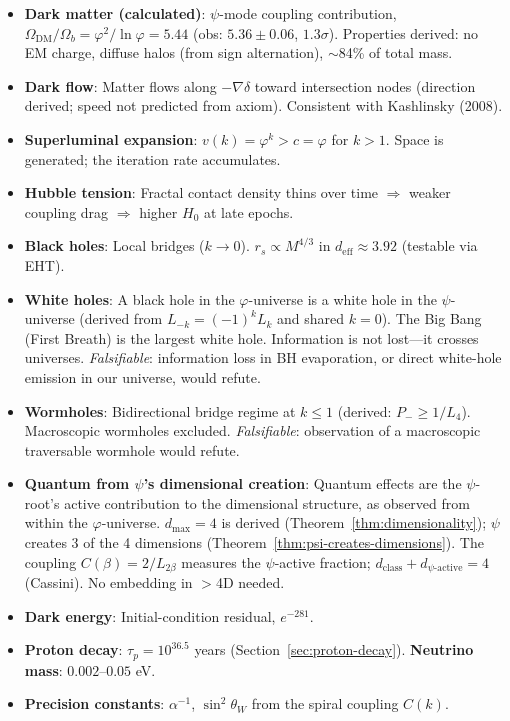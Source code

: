 \documentclass[12pt,a4paper]{article}
\begin{document}
\begin{itemize}
\item \textbf{Dark matter (calculated)}: $\psi$-mode coupling contribution, $\Omega_{\text{DM}}/\Omega_b = \varphi^2/\ln\varphi = 5.44$ (obs: $5.36 \pm 0.06$, $1.3\sigma$).  Properties derived: no EM charge, diffuse halos (from sign alternation), $\sim$84\% of total mass.
\item \textbf{Dark flow}: Matter flows along $-\nabla\delta$ toward intersection nodes (direction derived; speed not predicted from axiom). Consistent with Kashlinsky (2008).
\item \textbf{Superluminal expansion}: $v(k) = \varphi^k > c = \varphi$ for $k > 1$. Space is generated; the iteration rate accumulates.
\item \textbf{Hubble tension}: Fractal contact density thins over time $\Rightarrow$ weaker coupling drag $\Rightarrow$ higher $H_0$ at late epochs.
\item \textbf{Black holes}: Local bridges ($k \to 0$). $r_s \propto M^{4/3}$ in $d_{\mathrm{eff}} \approx 3.92$ (testable via EHT).
\item \textbf{White holes}: A black hole in the $\varphi$-universe is a white hole in the $\psi$-universe (derived from $L_{-k} = (-1)^k L_k$ and shared $k = 0$). The Big Bang (First Breath) is the largest white hole. Information is not lost---it crosses universes. \emph{Falsifiable}: information loss in BH evaporation, or direct white-hole emission in our universe, would refute.
\item \textbf{Wormholes}: Bidirectional bridge regime at $k \leq 1$ (derived: $P_- \geq 1/L_4$). Macroscopic wormholes excluded. \emph{Falsifiable}: observation of a macroscopic traversable wormhole would refute.
\item \textbf{Quantum from $\psi$'s dimensional creation}: Quantum effects are the $\psi$-root's active contribution to the dimensional structure, as observed from within the $\varphi$-universe.  $d_{\max} = 4$ is derived (Theorem~\ref{thm:dimensionality}); $\psi$ creates 3 of the 4 dimensions (Theorem~\ref{thm:psi-creates-dimensions}).  The coupling $C(\beta) = 2/L_{2\beta}$ measures the $\psi$-active fraction; $d_{\mathrm{class}} + d_{\psi\text{-active}} = 4$ (Cassini).  No embedding in $>$4D needed.
\item \textbf{Dark energy}: Initial-condition residual, $e^{-281}$.
\item \textbf{Proton decay}: $\tau_p = 10^{36.5}$ years (Section~\ref{sec:proton-decay}). \textbf{Neutrino mass}: $0.002$--$0.05$ eV.
\item \textbf{Precision constants}: $\alpha^{-1}$, $\sin^2\theta_W$ from the spiral coupling $C(k)$.

\end{itemize}
\end{document}
